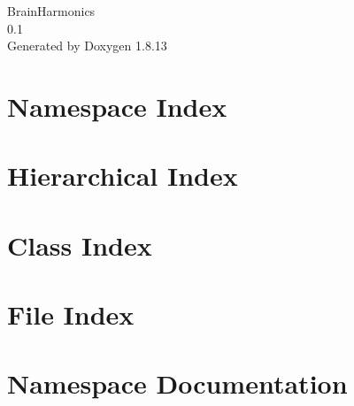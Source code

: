 \documentclass[twoside]{book}
\newcommand{\+}{\discretionary{\mbox{\scriptsize$\hookleftarrow$}}{}{}}
\newcommand{\clearemptydoublepage}{%
  \newpage{\pagestyle{empty}\cleardoublepage}%
}
\begin{document}
\hypersetup{pageanchor=false,
             bookmarksnumbered=true,
             pdfencoding=unicode
            }
\begin{titlepage}
\vspace*{7cm}
\begin{center}%
{\Large Brain\+Harmonics \\[1ex]\large 0.\+1 }\\
\vspace*{1cm}
{\large Generated by Doxygen 1.8.13}\\
\end{center}
\end{titlepage}
\clearemptydoublepage
{}
\tableofcontents
\clearemptydoublepage
{}
\hypersetup{pageanchor=true}

\chapter{Namespace Index}

\chapter{Hierarchical Index}

\chapter{Class Index}

\chapter{File Index}

\chapter{Namespace Documentation}


\end{document}
